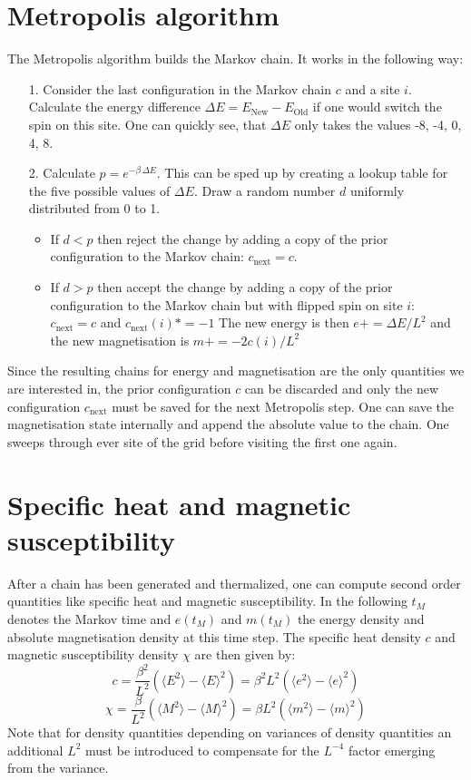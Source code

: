\documentclass[11pt, a4paper]{scrartcl}
\begin{document}
\section{Metropolis algorithm}
The Metropolis algorithm builds the Markov chain. It works in the following way:
\begin{itemize}
\item[1. ] Consider the last configuration in the Markov chain $c$ and a site $i$. Calculate the energy difference $\Delta E = E_{\mathrm{New}} - E_{\mathrm{Old}}$ if one would switch the spin on this site. One can quickly see, that $\Delta E$ only takes the values -8, -4, 0, 4, 8.
\item[2. ] Calculate $p = e^{- \beta\,\Delta E}$. This can be sped up by creating a lookup table for the five possible values of $\Delta E$. Draw a random number $d$ uniformly distributed from 0 to 1.
    \begin{itemize}
    \item If $d < p$ then reject the change by adding a copy of the prior configuration to the Markov chain: $c_{\mathrm{next}} = c$.
    \item If $d > p$ then accept the change by adding a copy of the prior configuration to the Markov chain but with flipped spin on site $i$: $c_{\mathrm{next}} = c$ and $c_{\mathrm{next}}(i) *= -1$ The new energy is then $e += \Delta E/L^2$ and the new magnetisation is $m += -2c(i)/L^2$
    \end{itemize}
\end{itemize}
Since the resulting chains for energy and magnetisation are the only quantities we are interested in, the prior configuration $c$ can be discarded and only the new configuration $c_{\mathrm{next}}$ must be saved for the next Metropolis step. One can save the magnetisation state internally and append the absolute value to the chain. One sweeps through ever site of the grid before visiting the first one again.

\section{Specific heat and magnetic susceptibility}
After a chain has been generated and thermalized, one can compute second order quantities like specific heat and magnetic susceptibility. In the following $t_M$ denotes the Markov time and $e(t_M)$ and $m(t_M)$ the energy density and absolute magnetisation density at this time step. The specific heat density $c$ and magnetic susceptibility density $\chi$ are then given by:
$$
c = \frac{\beta ^ 2}{L^2} (\langle E^2 \rangle - \langle E \rangle ^ 2) = \beta ^ 2 L^2 (\langle e^2 \rangle - \langle e \rangle ^ 2)
$$
$$
\chi = \frac{\beta}{L^2} (\langle M^2 \rangle - \langle M \rangle ^ 2) = \beta L^2 (\langle m^2 \rangle - \langle m \rangle ^ 2)
$$
Note that for density quantities depending on variances of density quantities an additional $L^2$ must be introduced to compensate for the $L^{-4}$ factor emerging from the variance.
\end{document}

